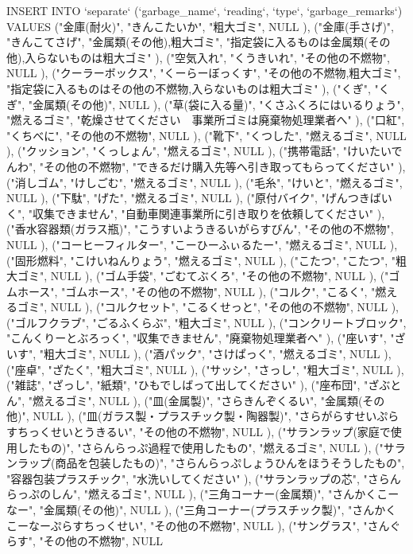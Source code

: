 INSERT INTO `separate` (`garbage_name`, `reading`, `type`, `garbage_remarks`) VALUES
("金庫(耐火)", "きんこたいか", "粗大ゴミ", NULL
), ("金庫(手さげ)", "きんこてさげ", "金属類(その他),粗大ゴミ", "指定袋に入るものは金属類(その他),入らないものは粗大ゴミ"
), ("空気入れ", "くうきいれ", "その他の不燃物", NULL
), ("クーラーボックス", "くーらーぼっくす", "その他の不燃物,粗大ゴミ", "指定袋に入るものはその他の不燃物,入らないものは粗大ゴミ"
), ("くぎ", "くぎ", "金属類(その他)", NULL
), ("草(袋に入る量)", "くさふくろにはいるりょう", "燃えるゴミ", "乾燥させてください　事業所ゴミは廃棄物処理業者へ"
), ("口紅", "くちべに", "その他の不燃物", NULL
), ("靴下", "くつした", "燃えるゴミ", NULL
), ("クッション", "くっしょん", "燃えるゴミ", NULL
), ("携帯電話", "けいたいでんわ", "その他の不燃物", "できるだけ購入先等へ引き取ってもらってください"
), ("消しゴム", "けしごむ", "燃えるゴミ", NULL
), ("毛糸", "けいと", "燃えるゴミ", NULL
), ("下駄", "げた", "燃えるゴミ", NULL
), ("原付バイク", "げんつきばいく", "収集できません", "自動車関連事業所に引き取りを依頼してください"
), ("香水容器類(ガラス瓶)", "こうすいようきるいがらすびん", "その他の不燃物", NULL
), ("コーヒーフィルター", "こーひーふぃるたー", "燃えるゴミ", NULL
), ("固形燃料", "こけいねんりょう", "燃えるゴミ", NULL
), ("こたつ", "こたつ", "粗大ゴミ", NULL
), ("ゴム手袋", "ごむてぶくろ", "その他の不燃物", NULL
), ("ゴムホース", "ゴムホース", "その他の不燃物", NULL
), ("コルク", "こるく", "燃えるゴミ", NULL
), ("コルクセット", "こるくせっと", "その他の不燃物", NULL
), ("ゴルフクラブ", "ごるふくらぶ", "粗大ゴミ", NULL
), ("コンクリートブロック", "こんくりーとぶろっく", "収集できません", "廃棄物処理業者へ"
), ("座いす", "ざいす", "粗大ゴミ", NULL
), ("酒パック", "さけぱっく", "燃えるゴミ", NULL
), ("座卓", "ざたく", "粗大ゴミ", NULL
), ("サッシ", "さっし", "粗大ゴミ", NULL
), ("雑誌", "ざっし", "紙類", "ひもでしばって出してください"
), ("座布団", "ざぶとん", "燃えるゴミ", NULL
), ("皿(金属製)", "さらきんぞくるい", "金属類(その他)", NULL
), ("皿(ガラス製・プラスチック製・陶器製)", "さらがらすせいぷらすちっくせいとうきるい", "その他の不燃物", NULL
), ("サランラップ(家庭で使用したもの)", "さらんらっぷ過程で使用したもの", "燃えるゴミ", NULL
), ("サランラップ(商品を包装したもの)", "さらんらっぷしょうひんをほうそうしたもの", "容器包装プラスチック", "水洗いしてください"
), ("サランラップの芯", "さらんらっぷのしん", "燃えるゴミ", NULL
), ("三角コーナー(金属類)", "さんかくこーなー", "金属類(その他)", NULL
), ("三角コーナー(プラスチック製)", "さんかくこーなーぷらすちっくせい", "その他の不燃物", NULL
), ("サングラス", "さんぐらす", "その他の不燃物", NULL

